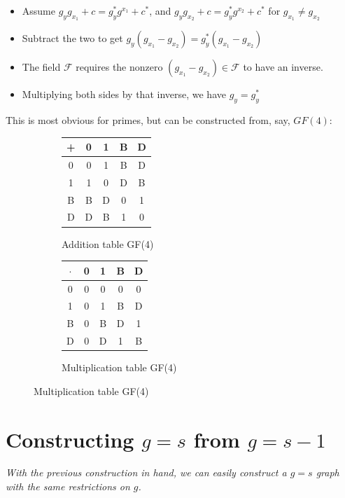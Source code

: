 \documentclass[11pt, oneside]{article} 	%
\begin{document}
\begin{itemize}
\item Assume $g_yg_{x_1} + c = g_y^*g^{x_1} +c^*$, and $g_yg_{x_2} + c = g_y^*g^{x_2} +c^*$ for $g_{x_1} \neq g_{x_2}$
\item Subtract the two to get $g_y(g_{x_1} - g_{x_2}) = g_y^*(g_{x_1} - g_{x_2})$
\item The field $\mathcal{F}$ requires the nonzero $(g_{x_1} - g_{x_2}) \in \mathcal{F}$ to have an inverse.  
\item Multiplying both sides by that inverse, we have $g_y = g_y^*$
\end{itemize}

This is most obvious for primes, but can be constructed from, say, $GF(4):$

\begin{figure}[!htb]
\centering
\begin{subfigure}{.5\textwidth}
 \centering
 \begin{tabular}{c | c c c c}
     + & 0 & 1 & B & D \\
\hline
     0 & 0 & 1 & B & D \\
     1 & 1 & 0 & D & B \\
     B & B & D & 0 & 1 \\
     D & D & B & 1  & 0 \\
     \end{tabular}
 \caption{Addition table GF(4)}
\label{fig:gf-add}
\end{subfigure}
\begin{subfigure}{.5\textwidth}
 \centering
\begin{tabular}{c | c c c c}
     $\cdot$ & 0 & 1 & B & D \\
\hline
     0 & 0 & 0 & 0 & 0 \\
     1 & 0 & 1 & B & D \\
     B & 0 & B & D & 1 \\
     D & 0 & D & 1 & B \\
\end{tabular}
 \caption{Multiplication table GF(4)}
\label{fig:gf-mult}
\end{subfigure}
\end{figure}






\section{Constructing $g=s$ from $g=s-1$}
\emph{With the previous construction in hand, we can easily construct a $g=s$ graph with the same restrictions on $g$.}
\end{document}

